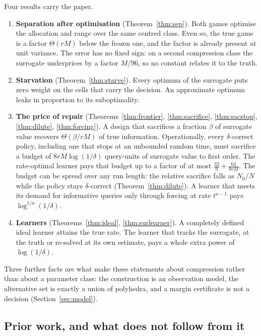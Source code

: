 Four results carry the paper.
\begin{enumerate}
\item[1)] \textbf{Separation after optimisation} (Theorem~\ref{thm:sep}). Both games optimise
the allocation and range over the same centred class. Even so, the true game is a factor
$\Theta(rM)$ below the frozen one, and the factor is already present at unit variance. The
error has no fixed sign: on a second compression class the surrogate underprices by a factor
$M/96$, so no constant relates it to the truth.
\item[2)] \textbf{Starvation} (Theorem~\ref{thm:starve}). Every optimum of the surrogate puts
zero weight on the cells that carry the decision. An approximate optimum leaks in proportion
to its suboptimality.
\item[3)] \textbf{The price of repair} (Theorems~\ref{thm:frontier}, \ref{thm:sacrifice},
\ref{thm:sacstop}, \ref{thm:dilute}, \ref{thm:forcing}). A design that sacrifices a fraction
$\beta$ of surrogate value recovers $\Theta(\beta/rM)$ of true information. Operationally, every
$\delta$-correct policy, including one that stops at an unbounded random time, must sacrifice a
budget of $8rM\log(1/\delta)$ query-units of surrogate value to first order. The rate-optimal
learner pays that budget up to a factor of at most $\frac{32}{9}+\frac{64}{9rM}$.
The budget can be spread over any run length: the relative sacrifice falls as $N_{0}/N$ while
the policy stays $\delta$-correct (Theorem~\ref{thm:dilute}).
A learner that meets its demand for informative queries only through forcing at rate
$t^{a-1}$ pays $\log^{1/a}(1/\delta)$.
\item[4)] \textbf{Learners} (Theorems~\ref{thm:ideal}, \ref{thm:surlearner}). A completely
defined ideal learner attains the true rate. The learner that tracks the surrogate, at the
truth or re-solved at its own estimate, pays a whole extra power of $\log(1/\delta)$.
\end{enumerate}
Three further facts are what make these statements about compression rather than about a
parameter class: the construction is an observation model, the alternative set is exactly a
union of polyhedra, and a margin certificate is not a decision (Section~\ref{sec:model}).

\subsection{Prior work, and what does not follow from it}

